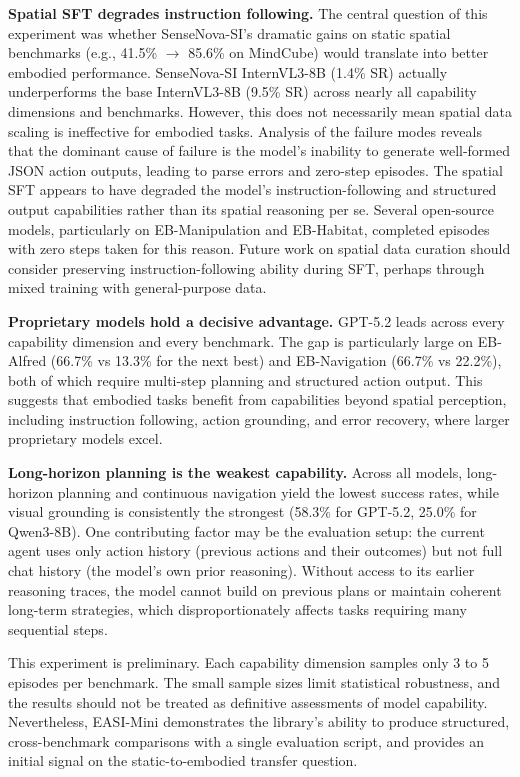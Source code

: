 \documentclass[
hf,
]{confart}
\begin{document}
\textbf{Spatial SFT degrades instruction following.} The central question of this experiment was whether SenseNova-SI's dramatic gains on static spatial benchmarks (e.g., 41.5\% $\to$ 85.6\% on MindCube) would translate into better embodied performance. SenseNova-SI InternVL3-8B (1.4\% SR) actually underperforms the base InternVL3-8B (9.5\% SR) across nearly all capability dimensions and benchmarks. However, this does not necessarily mean spatial data scaling is ineffective for embodied tasks. Analysis of the failure modes reveals that the dominant cause of failure is the model's inability to generate well-formed JSON action outputs, leading to parse errors and zero-step episodes. The spatial SFT appears to have degraded the model's instruction-following and structured output capabilities rather than its spatial reasoning per se. Several open-source models, particularly on EB-Manipulation and EB-Habitat, completed episodes with zero steps taken for this reason. Future work on spatial data curation should consider preserving instruction-following ability during SFT, perhaps through mixed training with general-purpose data.

\textbf{Proprietary models hold a decisive advantage.} GPT-5.2 leads across every capability dimension and every benchmark. The gap is particularly large on EB-Alfred (66.7\% vs 13.3\% for the next best) and EB-Navigation (66.7\% vs 22.2\%), both of which require multi-step planning and structured action output. This suggests that embodied tasks benefit from capabilities beyond spatial perception, including instruction following, action grounding, and error recovery, where larger proprietary models excel.

\textbf{Long-horizon planning is the weakest capability.} Across all models, long-horizon planning and continuous navigation yield the lowest success rates, while visual grounding is consistently the strongest (58.3\% for GPT-5.2, 25.0\% for Qwen3-8B). One contributing factor may be the evaluation setup: the current agent uses only action history (previous actions and their outcomes) but not full chat history (the model's own prior reasoning). Without access to its earlier reasoning traces, the model cannot build on previous plans or maintain coherent long-term strategies, which disproportionately affects tasks requiring many sequential steps.

This experiment is preliminary. Each capability dimension samples only 3 to 5 episodes per benchmark. The small sample sizes limit statistical robustness, and the results should not be treated as definitive assessments of model capability. Nevertheless, EASI-Mini demonstrates the library's ability to produce structured, cross-benchmark comparisons with a single evaluation script, and provides an initial signal on the static-to-embodied transfer question.
\end{document}
